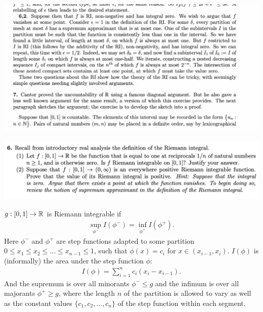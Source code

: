 \begin{mdframed}
  \includegraphics[width=400pt]{img/analysis--berkeley-202a-hw-5fee.png}
\end{mdframed}




\newpage
\begin{mdframed}
  \includegraphics[width=400pt]{img/analysis--berkeley-202a--homework-1-f5e8.png}
\end{mdframed}





\begin{definition*}
  $g: [0, 1] \to \mathbb{R}$ is Riemann integrable if
  \begin{align*}
    \sup_{\phi^-} I(\phi^-) = \inf_{\phi^+} I(\phi^+).
  \end{align*}
  Here $\phi^-$ and $\phi^+$ are step functions adapted​ to some
  partition $0 \leq x_1 \leq x_2 \leq \ldots \leq x_{n-1} \leq 1$, such that $\phi(x) = c_i$
  for $x \in (x_{i-1}, x_i)$. $I(\phi)$ is (informally) the area under the step function $\phi$:
  \begin{align*}
    I(\phi) = \sum_{i=1}^n c_i(x_i - x_{i-1}).
  \end{align*}
  And the supremum is over all minorants $\phi^- \leq g$ and the infimum is over all
  majorants $\phi^+ \geq g$, where the length $n$ of the partition is allowed to vary as well as the constant
  values $\{c_1, c_2, \ldots, c_n\}$ of the step function within each segment.
\end{definition*}


